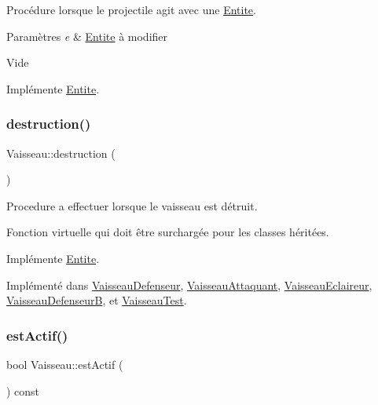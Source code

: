 Procédure lorsque le projectile agit avec une \hyperlink{class_entite}{Entite}. 


\begin{DoxyParams}{Paramètres}
{\em e} & \hyperlink{class_entite}{Entite} à modifier\\
\hline
\end{DoxyParams}
Vide 

Implémente \hyperlink{class_entite_a848ec47afac1d7ba970a2bcab5dc7b3b}{Entite}.

\mbox{\label{class_vaisseau_af4f490c5fd9e171b23067ec73aa737ad}} 
\subsubsection{\texorpdfstring{destruction()}{destruction()}}
{\footnotesize\ttfamily Vaisseau\+::destruction (\begin{DoxyParamCaption}{ }\end{DoxyParamCaption})\hspace{0.3cm}{\ttfamily [pure virtual]}}



Procedure a effectuer lorsque le vaisseau est détruit. 

Fonction virtuelle qui doit être surchargée pour les classes héritées. 

Implémente \hyperlink{class_entite_af5c424f69b2c880ae9c12786abd28592}{Entite}.



Implémenté dans \hyperlink{class_vaisseau_defenseur_a6816d325d737269cddc6310e7f68b222}{Vaisseau\+Defenseur}, \hyperlink{class_vaisseau_attaquant_af804e1fd491301c2385e10d88f4892a6}{Vaisseau\+Attaquant}, \hyperlink{class_vaisseau_eclaireur_a4f65343b67301d7fa98f5e02337cc1e1}{Vaisseau\+Eclaireur}, \hyperlink{class_vaisseau_defenseur_b_aba88319dcc7540dce39c164fa9853732}{Vaisseau\+DefenseurB}, et \hyperlink{class_vaisseau_test_a5b8b67886ecb73d8f720f8499ef3c378}{Vaisseau\+Test}.

\mbox{\label{class_vaisseau_a4f0c76d144f9f5f41b254bde4eb350da}} 
\subsubsection{\texorpdfstring{est\+Actif()}{estActif()}}
{\footnotesize\ttfamily bool Vaisseau\+::est\+Actif (\begin{DoxyParamCaption}{ }\end{DoxyParamCaption}) const\hspace{0.3cm}{\ttfamily [inline]}}

